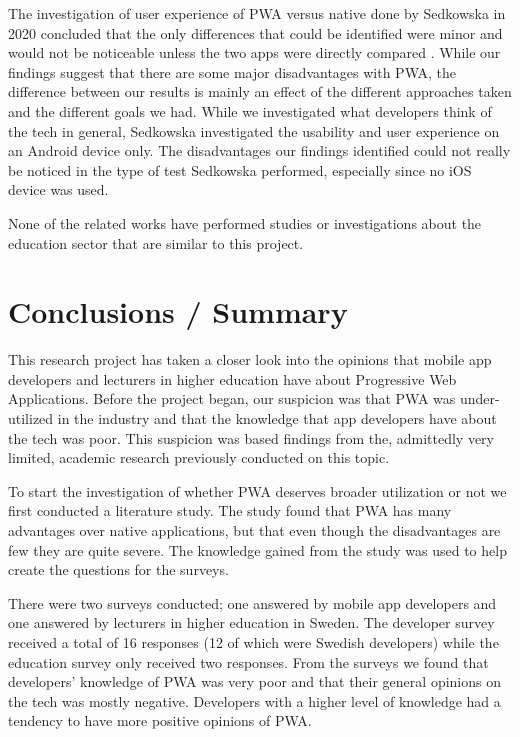 \documentclass[a4paper,12pt]{article}
\begin{document}
The investigation of user experience of PWA versus native done by Sedkowska in 2020 concluded that the only differences that could be identified were minor and would not be noticeable unless the two apps were directly compared \cite{thesis_pwa_ux}. While our findings suggest that there are some major disadvantages with PWA, the difference between our results is mainly an effect of the different approaches taken and the different goals we had. While we investigated what developers think of the tech in general, Sedkowska investigated the usability and user experience on an Android device only. The disadvantages our findings identified could not really be noticed in the type of test Sedkowska performed, especially since no iOS device was used.

None of the related works have performed  studies or investigations about the education sector that are similar to this project.

\newpage
		
\section{Conclusions / Summary}
\label{Conclusions}
This research project has taken a closer look into the opinions that mobile app developers and lecturers in higher education have about Progressive Web Applications. Before the project began, our suspicion was that PWA was under-utilized in the industry and that the knowledge that app developers have about the tech was poor. This suspicion was based findings from the, admittedly very limited, academic research previously conducted on this topic.

To start the investigation of whether PWA deserves broader utilization or not we first conducted a literature study. The study found that PWA has many advantages over native applications, but that even though the disadvantages are few they are quite severe. The knowledge gained from the study was used to help create the questions for the surveys.

There were two surveys conducted; one answered by mobile app developers and one answered by lecturers in higher education in Sweden. The developer survey received a total of 16 responses (12 of which were Swedish developers) while the education survey only received two responses. From the surveys we found that developers' knowledge of PWA was very poor and that their general opinions on the tech was mostly negative. Developers with a higher level of knowledge had a tendency to have more positive opinions of PWA.
\end{document}
